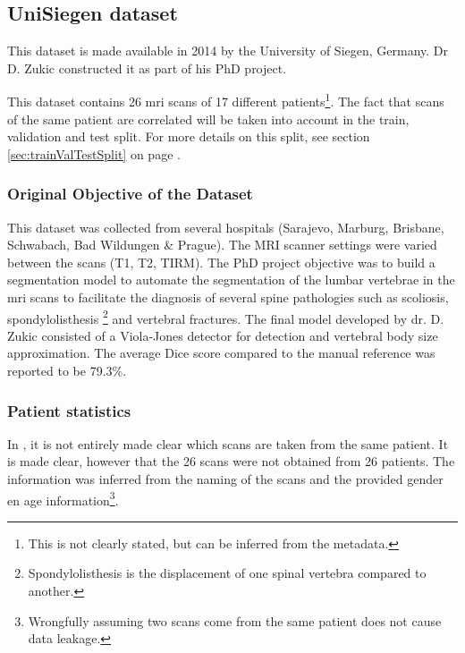 

\subsection{UniSiegen dataset\label{sec:DataUSiegen}}

This dataset is made available in 2014 by the University of Siegen, Germany.
Dr D. Zukic \cite{Zukic2014} constructed it as part of his PhD project.


This dataset contains 26 \acrshort{mri} scans of 17 different patients\footnote{This is not clearly stated, but can be inferred from the metadata.}. 
The fact that scans of the same patient are correlated will be taken into account in the train, validation and test split.
For more details on this split, see section \ref{sec:trainValTestSplit} on page \pageref{sec:trainValTestSplit}.

\subsubsection{Original Objective of the Dataset}

This dataset was collected from several hospitals (Sarajevo, Marburg, Brisbane, Schwabach, Bad Wildungen \& Prague). The MRI scanner settings were varied between the scans (T1, T2, TIRM).
The PhD project objective was to build a segmentation model to automate the segmentation of the lumbar vertebrae in the \acrshort{mri} scans to facilitate the diagnosis of several spine pathologies 
such as scoliosis, spondylolisthesis \footnote{Spondylolisthesis is the displacement of one spinal vertebra compared to another.} and vertebral fractures.
The final model developed by dr. D. Zukic consisted of a Viola-Jones detector for detection and vertebral body size approximation.
The average Dice score compared to the manual reference was reported to be 79.3\%.

\subsubsection{Patient statistics}

In \cite{Zukic2014}, it is not entirely made clear which scans are taken from the same patient.
It is made clear, however that the 26 scans were not obtained from 26 patients.
The information was inferred from the naming of the scans and the provided gender en age information\footnote{
    Wrongfully assuming two scans come from the same patient does not cause data leakage.
}.

